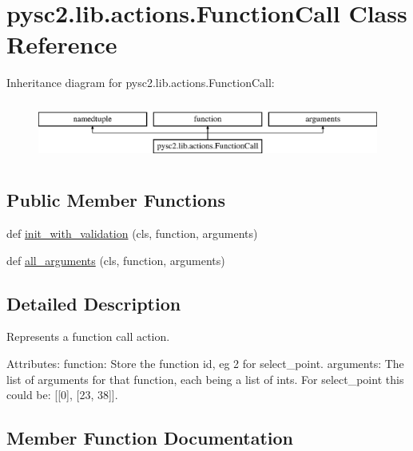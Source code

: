 \hypertarget{classpysc2_1_1lib_1_1actions_1_1_function_call}{}\section{pysc2.\+lib.\+actions.\+Function\+Call Class Reference}
\label{classpysc2_1_1lib_1_1actions_1_1_function_call}
Inheritance diagram for pysc2.\+lib.\+actions.\+Function\+Call\+:\begin{figure}[H]
\begin{center}
\leavevmode
\includegraphics[height=1.964912cm]{classpysc2_1_1lib_1_1actions_1_1_function_call}
\end{center}
\end{figure}
\subsection*{Public Member Functions}
\begin{DoxyCompactItemize}
\item 
def \mbox{\hyperlink{classpysc2_1_1lib_1_1actions_1_1_function_call_a5b3cf8e14a7b779c05e7b80bbed4181e}{init\+\_\+with\+\_\+validation}} (cls, function, arguments)
\item 
def \mbox{\hyperlink{classpysc2_1_1lib_1_1actions_1_1_function_call_a87d05030588a84efaa0c399fe68c3cde}{all\+\_\+arguments}} (cls, function, arguments)
\end{DoxyCompactItemize}


\subsection{Detailed Description}
\begin{DoxyVerb}Represents a function call action.

Attributes:
  function: Store the function id, eg 2 for select_point.
  arguments: The list of arguments for that function, each being a list of
      ints. For select_point this could be: [[0], [23, 38]].
\end{DoxyVerb}
 

\subsection{Member Function Documentation}
\mbox{\label{classpysc2_1_1lib_1_1actions_1_1_function_call_a87d05030588a84efaa0c399fe68c3cde}} 

